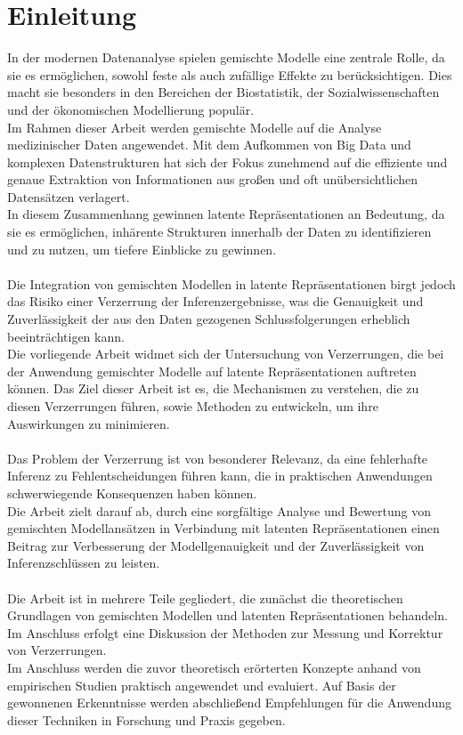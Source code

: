 \documentclass[%
thesis=student,%
coverpage=false,%
titlepage=false,%
headmarks=true, %
german,%
font=libertine, %
math=newpxtx, %
BCOR=5mm,%
coverBCOR=11mm%
]{tumbook}
\theoremstyle{break}
\begin{document}
\cleardoublepage{}

\tableofcontents

\mainmatter{}

\chapter{Einleitung}

In der modernen Datenanalyse spielen gemischte Modelle eine zentrale Rolle, da sie es ermöglichen, sowohl feste als auch zufällige Effekte zu berücksichtigen. Dies macht sie besonders in den Bereichen der Biostatistik, der Sozialwissenschaften und der ökonomischen Modellierung populär.\\ 
Im Rahmen dieser Arbeit werden gemischte Modelle auf die Analyse medizinischer Daten angewendet. Mit dem Aufkommen von Big Data und komplexen Datenstrukturen hat sich der Fokus zunehmend auf die effiziente und genaue Extraktion von Informationen aus großen und oft unübersichtlichen Datensätzen verlagert.\\ 
In diesem Zusammenhang gewinnen latente Repräsentationen an Bedeutung, da sie es ermöglichen, inhärente Strukturen innerhalb der Daten zu identifizieren und zu nutzen, um tiefere Einblicke zu gewinnen.\\
\\
Die Integration von gemischten Modellen in latente Repräsentationen birgt jedoch das Risiko einer Verzerrung der Inferenzergebnisse, was die Genauigkeit und Zuverlässigkeit der aus den Daten gezogenen Schlussfolgerungen erheblich beeinträchtigen kann.\\ 
Die vorliegende Arbeit widmet sich der Untersuchung von Verzerrungen, die bei der Anwendung gemischter Modelle auf latente Repräsentationen auftreten können. Das Ziel dieser Arbeit ist es, die Mechanismen zu verstehen, die zu diesen Verzerrungen führen, sowie Methoden zu entwickeln, um ihre Auswirkungen zu minimieren.\\
\\
Das Problem der Verzerrung ist von besonderer Relevanz, da eine fehlerhafte Inferenz zu Fehlentscheidungen führen kann, die in praktischen Anwendungen schwerwiegende Konsequenzen haben können.\\
Die Arbeit zielt darauf ab, durch eine sorgfältige Analyse und Bewertung von gemischten Modellansätzen in Verbindung mit latenten Repräsentationen einen Beitrag zur Verbesserung der Modellgenauigkeit und der Zuverlässigkeit von Inferenzschlüssen zu leisten.\\
\\
Die Arbeit ist in mehrere Teile gegliedert, die zunächst die theoretischen Grundlagen von gemischten Modellen und latenten Repräsentationen behandeln. Im Anschluss erfolgt eine Diskussion der Methoden zur Messung und Korrektur von Verzerrungen. \\
Im Anschluss werden die zuvor theoretisch erörterten Konzepte anhand von empirischen Studien praktisch angewendet und evaluiert. Auf Basis der gewonnenen Erkenntnisse werden abschließend Empfehlungen für die Anwendung dieser Techniken in Forschung und Praxis gegeben.\\
\\
\end{document}
